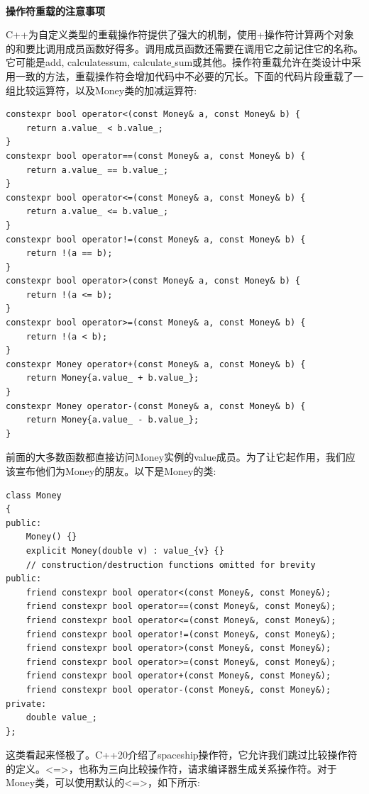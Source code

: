 \noindent\textbf{}\ \par
\textbf{操作符重载的注意事项} \ \par
C++为自定义类型的重载操作符提供了强大的机制，使用+操作符计算两个对象的和要比调用成员函数好得多。调用成员函数还需要在调用它之前记住它的名称。它可能是add, calculatessum, calculate\underline{ }sum或其他。操作符重载允许在类设计中采用一致的方法，重载操作符会增加代码中不必要的冗长。下面的代码片段重载了一组比较运算符，以及Money类的加减运算符:\par

\begin{lstlisting}[caption={}]
constexpr bool operator<(const Money& a, const Money& b) {
	return a.value_ < b.value_;
}
constexpr bool operator==(const Money& a, const Money& b) {
	return a.value_ == b.value_;
}
constexpr bool operator<=(const Money& a, const Money& b) {
	return a.value_ <= b.value_;
}
constexpr bool operator!=(const Money& a, const Money& b) {
	return !(a == b);
}
constexpr bool operator>(const Money& a, const Money& b) {
	return !(a <= b);
}
constexpr bool operator>=(const Money& a, const Money& b) {
	return !(a < b);
}
constexpr Money operator+(const Money& a, const Money& b) {
	return Money{a.value_ + b.value_};
}
constexpr Money operator-(const Money& a, const Money& b) {
	return Money{a.value_ - b.value_};
}
\end{lstlisting}

前面的大多数函数都直接访问Money实例的value成员。为了让它起作用，我们应该宣布他们为Money的朋友。以下是Money的类: \par

\begin{lstlisting}[caption={}]
class Money
{
public:
	Money() {}
	explicit Money(double v) : value_{v} {}
	// construction/destruction functions omitted for brevity
public:
	friend constexpr bool operator<(const Money&, const Money&);
	friend constexpr bool operator==(const Money&, const Money&);
	friend constexpr bool operator<=(const Money&, const Money&);
	friend constexpr bool operator!=(const Money&, const Money&);
	friend constexpr bool operator>(const Money&, const Money&);
	friend constexpr bool operator>=(const Money&, const Money&);
	friend constexpr bool operator+(const Money&, const Money&);
	friend constexpr bool operator-(const Money&, const Money&);
private:
	double value_;
};
\end{lstlisting}

这类看起来怪极了。C++20介绍了spaceship操作符，它允许我们跳过比较操作符的定义。<=>，也称为三向比较操作符，请求编译器生成关系操作符。对于Money类，可以使用默认的<=>，如下所示: \par

